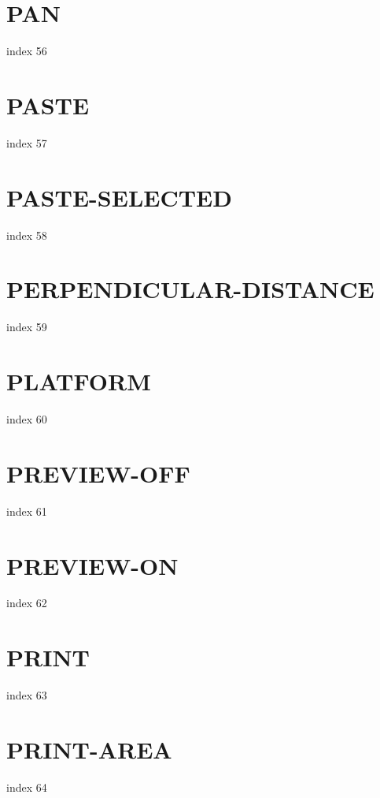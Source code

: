 \documentclass[10pt]{report}
\begin{document}
\section{PAN}

index 56

\section{PASTE}

index 57

\section{PASTE-SELECTED}

index 58

\section{PERPENDICULAR-DISTANCE}

index 59

\section{PLATFORM}

index 60

\section{PREVIEW-OFF}

index 61

\section{PREVIEW-ON}

index 62

\section{PRINT}

index 63

\section{PRINT-AREA}

index 64
\end{document}
